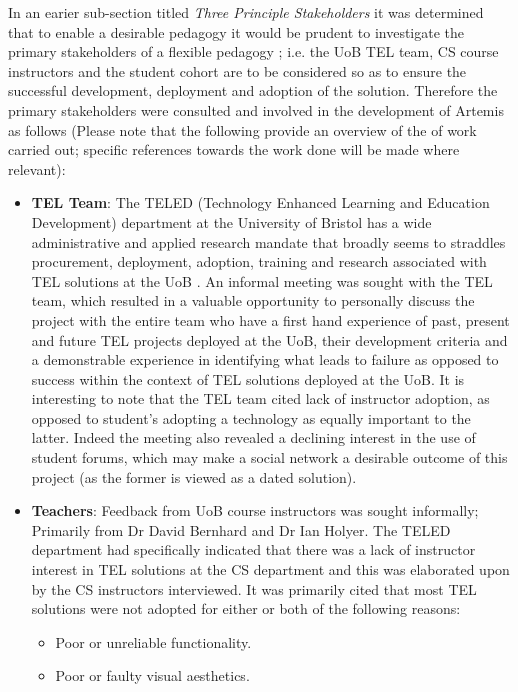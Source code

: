In an earier sub-section titled  \textit{Three Principle Stakeholders} it was determined that to enable a desirable pedagogy it would be prudent to investigate the primary stakeholders of a flexible pedagogy \cite{Gordon2014}; i.e. the UoB TEL team, CS course instructors and the student cohort are to be considered so as to ensure the successful development, deployment and adoption of the solution. Therefore the primary stakeholders were consulted and involved in the development of Artemis as follows (Please note that the following provide an overview of the of work carried out; specific references towards the work done will be made where relevant):
\begin{itemize}
    \item \textbf{TEL Team}: The TELED (Technology Enhanced Learning and Education Development)  department at the University of Bristol has a wide administrative and applied research mandate that broadly seems to straddles procurement, deployment, adoption, training and research associated with TEL solutions at the UoB \cite{UniversityofBristol}. An informal meeting was sought with the TEL team, which resulted in a valuable opportunity to personally discuss the project with the entire team who have a first hand experience of past, present and future TEL projects deployed at the UoB, their development criteria and a demonstrable experience in identifying what leads to failure as opposed to success within the context of TEL solutions deployed at the UoB. It is interesting to note that the TEL team cited lack of instructor adoption, as opposed to student's adopting a technology as equally important to the latter. Indeed the meeting also revealed a declining interest in the use of student forums, which may make a social network a desirable outcome of this project (as the former is viewed as a dated solution).
    
    \item \textbf{Teachers}: Feedback from UoB course instructors was sought informally; Primarily from Dr David Bernhard and Dr Ian Holyer. The TELED department had specifically indicated that there was a lack of instructor interest in TEL solutions at the CS department and this was elaborated upon by the CS instructors interviewed. It was primarily cited that most TEL solutions were not adopted for either or both of the following reasons:
    \begin{itemize}
        \item Poor or unreliable functionality.
        \item Poor or faulty visual aesthetics.
    \end{itemize}
    

\end{itemize}
